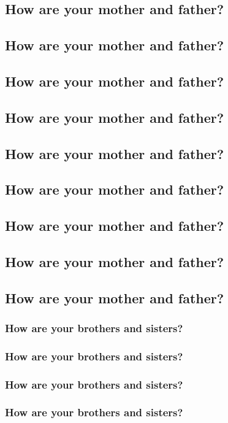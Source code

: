 \documentclass[fleqn]{report}
\begin{document}
\subsection{How are your mother and father?}
\subsection{How are your mother and father?}
\subsection{How are your mother and father?}
\subsection{How are your mother and father?}
\subsection{How are your mother and father?}
\subsection{How are your mother and father?}
\subsection{How are your mother and father?}
\subsection{How are your mother and father?}
\subsection{How are your mother and father?}
\subsubsection{How are your brothers and sisters?}
\subsubsection{How are your brothers and sisters?}
\subsubsection{How are your brothers and sisters?}
\subsubsection{How are your brothers and sisters?}
\end{document}
